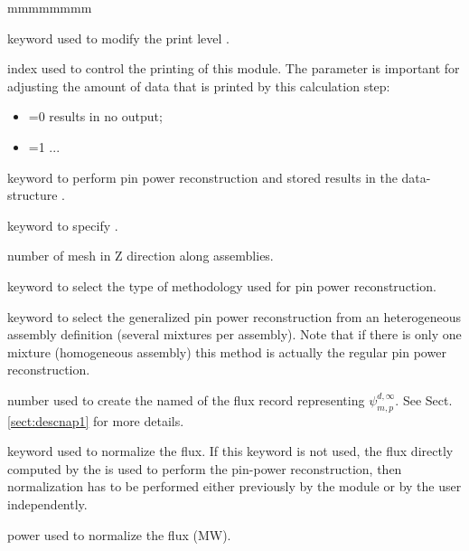 \begin{ListeDeDescription}{mmmmmmmm}

\item[\moc{EDIT}] keyword used to modify the print level .

\item[\dusa{iprint}] index used to control the printing of this module. The
 parameter is important for adjusting the amount of data that is
printed by this calculation step:

\begin{itemize}

\item {}=0 results in no output;

\item {}=1 ...

\end{itemize}

\item[\moc{PPR}] keyword to perform pin power reconstruction and stored results in the  data-structure .

\item[\moc{NZASS}] keyword to specify . 

\item[\dusa{nzass}] number of mesh in Z direction along assemblies. 

\item[\moc{METH}] keyword to select the type of methodology used for pin power reconstruction.

\item[\moc{GPPR}] keyword to select the generalized pin power reconstruction from an heterogeneous assembly definition (several mixtures per assembly). Note that if there is only one mixture (homogeneous assembly) this method is actually the regular pin power reconstruction.

\item[\dusa{ifx}] number used to create the named of the flux record representing $\psi_{m,p}^{d,\infty}$. See Sect. \ref{sect:descnap1} for more details.

\item[\moc{POWER}] keyword used to normalize the flux. If this keyword is not used, the flux directly computed by the  is used to perform the pin-power reconstruction,  then normalization has to be performed either previously by the  module  or by the user independently. 

\item[\dusa{pow}] power used to normalize the flux (MW). 

\end{ListeDeDescription}

